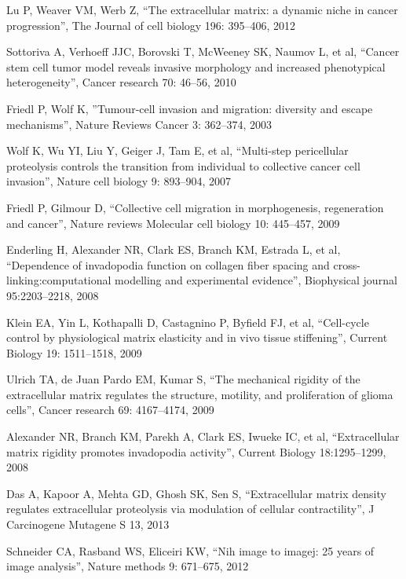 \begin{thebibliography}{}
 Lu P, Weaver VM, Werb Z, 
``The extracellular matrix: a dynamic niche in cancer progression'', 
The Journal of cell biology 196: 395–406, 2012 

 Sottoriva A, Verhoeff JJC, Borovski T, McWeeney SK, Naumov L, et al, 
``Cancer stem cell tumor model reveals invasive morphology and increased phenotypical heterogeneity'', 
Cancer research 70: 46–56,  2010

 Friedl P, Wolf K, 
''Tumour-cell invasion and migration: diversity and escape mechanisms'', 
Nature Reviews Cancer 3: 362–374, 2003

 Wolf K, Wu YI, Liu Y, Geiger J, Tam E, et al, 
``Multi-step pericellular proteolysis controls the transition from individual to collective cancer cell invasion'', 
Nature cell biology 9: 893–904, 2007

 Friedl P, Gilmour D, 
``Collective cell migration in morphogenesis, regeneration and cancer'', 
Nature reviews Molecular cell biology 10: 445–457, 2009 

 Enderling H, Alexander NR, Clark ES, Branch KM, Estrada L, et al,  
``Dependence of invadopodia function on collagen fiber spacing and cross-linking:computational modelling and experimental evidence'', 
Biophysical journal 95:2203–2218, 2008

 Klein EA, Yin L, Kothapalli D, Castagnino P, Byfield FJ, et al, 
``Cell-cycle control by physiological matrix elasticity and in vivo tissue stiffening'', 
Current Biology 19: 1511–1518, 2009

 Ulrich TA, de Juan Pardo EM, Kumar S, 
``The mechanical rigidity of the extracellular matrix regulates the structure, motility, and proliferation of glioma cells'', 
Cancer research 69: 4167–4174, 2009

 Alexander NR, Branch KM, Parekh A, Clark ES, Iwueke IC, et al, 
``Extracellular matrix rigidity promotes invadopodia activity'', 
Current Biology 18:1295–1299, 2008

 Das A, Kapoor A, Mehta GD, Ghosh SK, Sen S,  
``Extracellular matrix density regulates extracellular proteolysis via modulation of cellular contractility'', 
J Carcinogene Mutagene S 13, 2013

 Schneider CA, Rasband WS, Eliceiri KW, 
``Nih image to imagej: 25 years of image analysis'', 
Nature methods 9: 671–675, 2012


\end{thebibliography}
